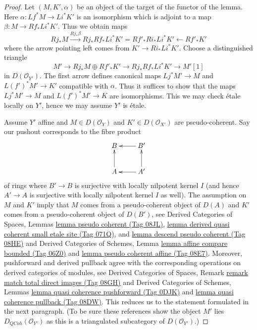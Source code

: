 \documentclass{amsart}
\theoremstyle{plain}
\theoremstyle{definition}
\theoremstyle{remark}
\numberwithin{equation}{subsection}
\def\QCoh{\mathit{QCoh}}
\begin{document}
\begin{proof}
Let $(M, K', \alpha)$ be an object of the target of the functor
of the lemma. Here $\alpha : Lf^*M \to Li^*K'$
is an isomorphism which is adjoint to a map $\beta : M \to Rf_*Li^*K'$.
Thus we obtain maps
$$
Rj_*M \xrightarrow{Rj_*\beta}
Rj_*Rf_*Li^*K' = Rf'_*Ri_*Li^*K' \leftarrow Rf'_*K'
$$
where the arrow pointing left comes from $K' \to Ri_*Li^*K'$.
Choose a distinguished triangle
$$
M' \to Rj_*M \oplus Rf'_*K' \to Rj_*Rf_*Li^*K' \to M'[1]
$$
in $D(\mathcal{O}_{Y'})$. The first arrow defines canonical maps
$Lj^*M' \to M$ and $L(f')^*M' \to K'$ compatible with $\alpha$.
Thus it suffices to show that the maps
$Lj^*M' \to M$ and $L(f')^*M' \to K$ are isomorphisms.
This we may check \'etale locally on $Y'$, hence we may
assume $Y'$ is \'etale.

\medskip\noindent
Assume $Y'$ affine and $M \in D(\mathcal{O}_Y)$
and $K' \in D(\mathcal{O}_{X'})$ are pseudo-coherent.
Say our pushout corresponds to the fibre product
$$
\xymatrix{
B & B' \ar[l] \\
A \ar[u] & A' \ar[l] \ar[u]
}
$$
of rings where $B' \to B$ is surjective with locally nilpotent kernel $I$
(and hence $A' \to A$ is surjective with locally nilpotent kernel $I$ as well).
The assumption on $M$ and $K'$ imply that $M$ comes from a pseudo-coherent
object of $D(A)$ and $K'$ comes from a pseudo-coherent object of $D(B')$, see
Derived Categories of Spaces, Lemmas
\href{https://stacks.math.columbia.edu/tag/08JL}{lemma pseudo coherent (Tag 08JL)},
\href{https://stacks.math.columbia.edu/tag/071Q}{lemma derived quasi coherent small etale site (Tag 071Q)}, and
\href{https://stacks.math.columbia.edu/tag/08HE}{lemma descend pseudo coherent (Tag 08HE)}
and
Derived Categories of Schemes, Lemma
\href{https://stacks.math.columbia.edu/tag/06Z0}{lemma affine compare bounded (Tag 06Z0)} and
\href{https://stacks.math.columbia.edu/tag/08E7}{lemma pseudo coherent affine (Tag 08E7)}.
Moreover, pushforward and derived pullback agree with the
corresponding operations on derived categories of modules, see
Derived Categories of Spaces, Remark
\href{https://stacks.math.columbia.edu/tag/08GH}{remark match total direct images (Tag 08GH)}
and
Derived Categories of Schemes, Lemmas
\href{https://stacks.math.columbia.edu/tag/0DJK}{lemma quasi coherence pushforward (Tag 0DJK)} and
\href{https://stacks.math.columbia.edu/tag/08DW}{lemma quasi coherence pullback (Tag 08DW)}.
This reduces us to the statement formulated in the next paragraph.
(To be sure these references show
the object $M'$ lies $D_\QCoh(\mathcal{O}_{Y'})$
as this is a triangulated subcategory of $D(\mathcal{O}_{Y'})$.)


\end{proof}
\end{document}

